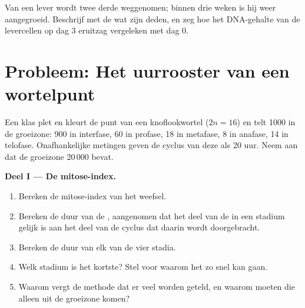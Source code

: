 \begin{exercise}[$\star\star\star$]\label{exo:g11:cell-cycle-mitosis:15}
Van een lever wordt twee derde weggenomen; binnen drie weken is hij weer
aangegroeid. Beschrijf met de  wat zijn  deden, en zeg hoe
het DNA-gehalte van de levercellen op dag 3 eruitzag vergeleken met dag 0.
\end{exercise}

\section{Probleem: Het uurrooster van een wortelpunt}

\begin{problem}
\label{pb:g11:cell-cycle-mitosis:1}
Een klas plet en kleurt de punt van een knoflookwortel ($2n = 16$) en
telt 1000  in de groeizone: 900 in interfase, 60 in profase, 18 in
metafase, 8 in anafase, 14 in telofase. Onafhankelijke metingen geven de
cyclus van deze  als 20 uur. Neem aan dat de groeizone
20\,000  bevat.

\medskip
\noindent\textbf{Deel I --- De mitose-index.}
\begin{enumerate}
  \item Bereken de mitose-index van het weefsel.
  \item Bereken de duur van de , aangenomen dat het deel van de
         in een stadium gelijk is aan het deel van de cyclus dat
        daarin wordt doorgebracht.
  \item Bereken de duur van elk van de vier stadia.
  \item Welk stadium is het kortste? Stel voor waarom het zo snel kan
        gaan.
  \item Waarom vergt de methode dat er veel  worden geteld, en
        waarom moeten die alleen uit de groeizone komen?
\end{enumerate}


\end{problem}
